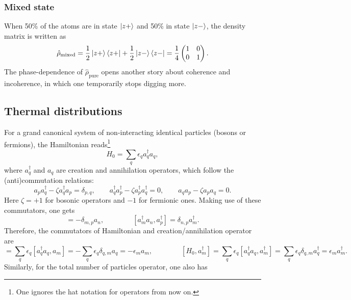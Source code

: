 \documentclass[a4paper,12pts,dvipsnames]{article}
\numberwithin{equation}{section}
\begin{document}
\subsubsection*{Mixed state}
When 50\% of the atoms are in state $\ket{z+}$ and 50\% in state $\ket{z-}$, the density matrix is written as
\begin{equation}
	\hat{\rho}_{\text{mixed}} = \frac{1}{2}\ket{z+}\bra{z+} + \frac{1}{2}\ket{z-}\bra{z-} = \frac{1}{4}\begin{pmatrix} 1 & 0 \\ 0 & 1 \end{pmatrix}.
\end{equation}
The phase-dependence of $\hat{\rho}_{\text{pure}}$ opens another story about coherence and incoherence, in which one temporarily stops digging more.
\subsection{Thermal distributions}
For a grand canonical system of non-interacting identical particles (bosons or fermions), the Hamiltonian reads\footnote{One ignores the hat notation for operators from now on.}
\begin{equation}
H_0 = \sum_{q}\epsilon_qa^{\dagger}_qa_q,
\end{equation}
where $a^{\dagger}_q$ and $a_q$ are creation and annihilation operators, which follow the (anti)commutation relations:
\begin{equation}
	a_pa^{\dagger}_q - \zeta a^{\dagger}_qa_p = \delta_{p,q},\qquad a^{\dagger}_qa^{\dagger}_p - \zeta a^{\dagger}_pa^{\dagger}_q = 0,\qquad a_qa_p - \zeta a_pa_q = 0.
\end{equation}
Here $\zeta=+1$ for bosonic operators and $-1$ for fermionic ones. Making use of these commutators, one gets
\begin{equation}
[a^{\dagger}_ma_n,a_p] = -\delta_{m,p}a_{n},\qquad\qquad [a^{\dagger}_ma_n,a^{\dagger}_p] = \delta_{n,p}a^{\dagger}_{m}.
\end{equation}
Therefore, the commutators of Hamiltonian and creation/annihilation operator are
\begin{equation}
[H_0,a_m] = \sum_{q}\epsilon_q[a^{\dagger}_qa_q,a_m] = -\sum_{q}\epsilon_q\delta_{q,m}a_q = -\epsilon_ma_m,\qquad\qquad [H_0,a^{\dagger}_m] = \sum_{q}\epsilon_q[a^{\dagger}_qa_q,a^{\dagger}_m] = \sum_{q}\epsilon_q\delta_{q,m}a^{\dagger}_q = \epsilon_ma^{\dagger}_m.
\end{equation}
Similarly, for the total number of particles operator, one also has
\end{document}
